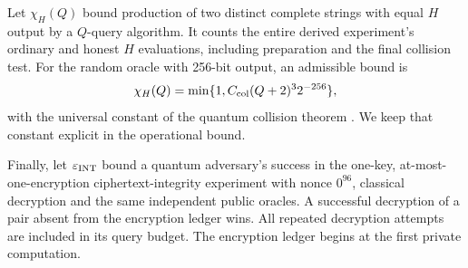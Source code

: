 Let $\chi_H(Q)$ bound production of two distinct complete strings with
equal $H$ output by a $Q$-query algorithm. It counts the entire derived
experiment's ordinary and honest $H$ evaluations, including preparation
and the final collision test. For the random oracle with 256-bit output,
an admissible bound is
\[
 \chi_H(Q)=\min\{1,C_{\rm col}(Q+2)^3 2^{-256}\},
\]
with the universal constant of the quantum collision theorem
\cite[Theorem~7]{zhandryCollision2015}. We keep that constant explicit
in the operational bound.

Finally, let $\varepsilon_{\rm INT}$ bound a quantum adversary's success
in the one-key, at-most-one-encryption ciphertext-integrity experiment
with nonce $0^{96}$, classical decryption and the same independent public
oracles. A successful decryption of a pair absent from the encryption
ledger wins. All repeated decryption attempts are included in its query
budget. The encryption ledger begins at the first private computation.

